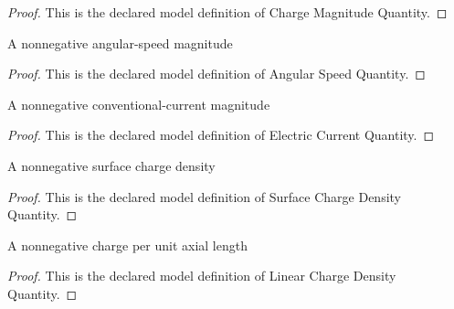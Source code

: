 \begin{proof}
  This is the declared model definition of Charge Magnitude Quantity.
\end{proof}
\begin{definition}
  \label{def:physics:phyx-mini-0969:phyxminiproblems-problemphyxmini0969-angularspeedquantity}
  A nonnegative angular-speed magnitude
\end{definition}
\begin{proof}
  This is the declared model definition of Angular Speed Quantity.
\end{proof}
\begin{definition}
  \label{def:physics:phyx-mini-0969:phyxminiproblems-problemphyxmini0969-electriccurrentquantity}
  A nonnegative conventional-current magnitude
\end{definition}
\begin{proof}
  This is the declared model definition of Electric Current Quantity.
\end{proof}
\begin{definition}
  \label{def:physics:phyx-mini-0969:phyxminiproblems-problemphyxmini0969-surfacechargedensityquantity}
  A nonnegative surface charge density
\end{definition}
\begin{proof}
  This is the declared model definition of Surface Charge Density Quantity.
\end{proof}
\begin{definition}
  \label{def:physics:phyx-mini-0969:phyxminiproblems-problemphyxmini0969-linearchargedensityquantity}
  A nonnegative charge per unit axial length
\end{definition}
\begin{proof}
  This is the declared model definition of Linear Charge Density Quantity.
\end{proof}
